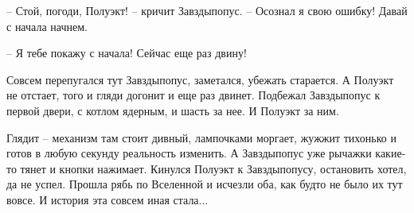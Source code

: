 \documentclass[ebook,oneside,final,openright]{memoir}
\begin{document}
\par
– Стой, погоди, Полуэкт! – кричит Завздыпопус. – Осознал я свою ошибку! Давай с начала начнем.\par
– Я тебе покажу с начала! Сейчас еще раз двину!\par
\par
Совсем перепугался тут Завздыпопус, заметался, убежать старается. А Полуэкт не отстает, того и гляди догонит и еще раз двинет. Подбежал Завздыпопус к первой двери, с котлом ядерным, и шасть за нее. И Полуэкт за ним.\par
\par
Глядит – механизм там стоит дивный, лампочками моргает, жужжит тихонько и готов в любую секунду реальность изменить. А Завздыпопус уже рычажки какие-то тянет и кнопки нажимает. Кинулся Полуэкт к Завздыпопусу, остановить хотел, да не успел. Прошла рябь по Вселенной и исчезли оба, как будто не было их тут вовсе. И история эта совсем иная стала...\par
\end{document}
